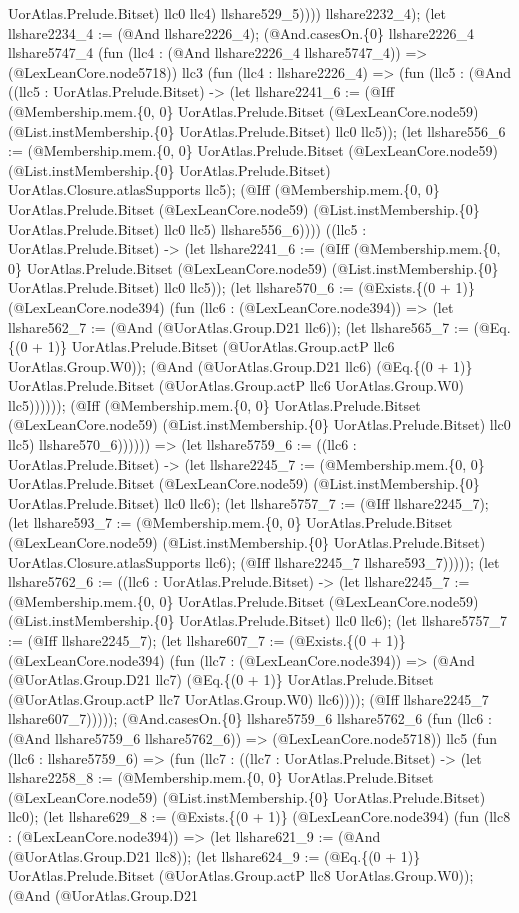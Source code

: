 \documentclass[11pt]{article}
\begin{document}
UorAtlas.Prelude.Bitset) llc0 llc4) llshare529\_5)))) llshare2232\_4); (let llshare2234\_4 := (@And llshare2226\_4); (@And.casesOn.\{0\} llshare2226\_4 llshare5747\_4 (fun (llc4 : (@And llshare2226\_4 llshare5747\_4)) => (@LexLeanCore.node5718)) llc3 (fun (llc4 : llshare2226\_4) => (fun (llc5 : (@And ((llc5 : UorAtlas.Prelude.Bitset) -> (let llshare2241\_6 := (@Iff (@Membership.mem.\{0, 0\} UorAtlas.Prelude.Bitset (@LexLeanCore.node59) (@List.instMembership.\{0\} UorAtlas.Prelude.Bitset) llc0 llc5)); (let llshare556\_6 := (@Membership.mem.\{0, 0\} UorAtlas.Prelude.Bitset (@LexLeanCore.node59) (@List.instMembership.\{0\} UorAtlas.Prelude.Bitset) UorAtlas.Closure.atlasSupports llc5); (@Iff (@Membership.mem.\{0, 0\} UorAtlas.Prelude.Bitset (@LexLeanCore.node59) (@List.instMembership.\{0\} UorAtlas.Prelude.Bitset) llc0 llc5) llshare556\_6)))) ((llc5 : UorAtlas.Prelude.Bitset) -> (let llshare2241\_6 := (@Iff (@Membership.mem.\{0, 0\} UorAtlas.Prelude.Bitset (@LexLeanCore.node59) (@List.instMembership.\{0\} UorAtlas.Prelude.Bitset) llc0 llc5)); (let llshare570\_6 := (@Exists.\{(0 + 1)\} (@LexLeanCore.node394) (fun (llc6 : (@LexLeanCore.node394)) => (let llshare562\_7 := (@And (@UorAtlas.Group.D21 llc6)); (let llshare565\_7 := (@Eq.\{(0 + 1)\} UorAtlas.Prelude.Bitset (@UorAtlas.Group.actP llc6 UorAtlas.Group.W0)); (@And (@UorAtlas.Group.D21 llc6) (@Eq.\{(0 + 1)\} UorAtlas.Prelude.Bitset (@UorAtlas.Group.actP llc6 UorAtlas.Group.W0) llc5)))))); (@Iff (@Membership.mem.\{0, 0\} UorAtlas.Prelude.Bitset (@LexLeanCore.node59) (@List.instMembership.\{0\} UorAtlas.Prelude.Bitset) llc0 llc5) llshare570\_6)))))) => (let llshare5759\_6 := ((llc6 : UorAtlas.Prelude.Bitset) -> (let llshare2245\_7 := (@Membership.mem.\{0, 0\} UorAtlas.Prelude.Bitset (@LexLeanCore.node59) (@List.instMembership.\{0\} UorAtlas.Prelude.Bitset) llc0 llc6); (let llshare5757\_7 := (@Iff llshare2245\_7); (let llshare593\_7 := (@Membership.mem.\{0, 0\} UorAtlas.Prelude.Bitset (@LexLeanCore.node59) (@List.instMembership.\{0\} UorAtlas.Prelude.Bitset) UorAtlas.Closure.atlasSupports llc6); (@Iff llshare2245\_7 llshare593\_7))))); (let llshare5762\_6 := ((llc6 : UorAtlas.Prelude.Bitset) -> (let llshare2245\_7 := (@Membership.mem.\{0, 0\} UorAtlas.Prelude.Bitset (@LexLeanCore.node59) (@List.instMembership.\{0\} UorAtlas.Prelude.Bitset) llc0 llc6); (let llshare5757\_7 := (@Iff llshare2245\_7); (let llshare607\_7 := (@Exists.\{(0 + 1)\} (@LexLeanCore.node394) (fun (llc7 : (@LexLeanCore.node394)) => (@And (@UorAtlas.Group.D21 llc7) (@Eq.\{(0 + 1)\} UorAtlas.Prelude.Bitset (@UorAtlas.Group.actP llc7 UorAtlas.Group.W0) llc6)))); (@Iff llshare2245\_7 llshare607\_7))))); (@And.casesOn.\{0\} llshare5759\_6 llshare5762\_6 (fun (llc6 : (@And llshare5759\_6 llshare5762\_6)) => (@LexLeanCore.node5718)) llc5 (fun (llc6 : llshare5759\_6) => (fun (llc7 : ((llc7 : UorAtlas.Prelude.Bitset) -> (let llshare2258\_8 := (@Membership.mem.\{0, 0\} UorAtlas.Prelude.Bitset (@LexLeanCore.node59) (@List.instMembership.\{0\} UorAtlas.Prelude.Bitset) llc0); (let llshare629\_8 := (@Exists.\{(0 + 1)\} (@LexLeanCore.node394) (fun (llc8 : (@LexLeanCore.node394)) => (let llshare621\_9 := (@And (@UorAtlas.Group.D21 llc8)); (let llshare624\_9 := (@Eq.\{(0 + 1)\} UorAtlas.Prelude.Bitset (@UorAtlas.Group.actP llc8 UorAtlas.Group.W0)); (@And (@UorAtlas.Group.D21 
\end{document}
